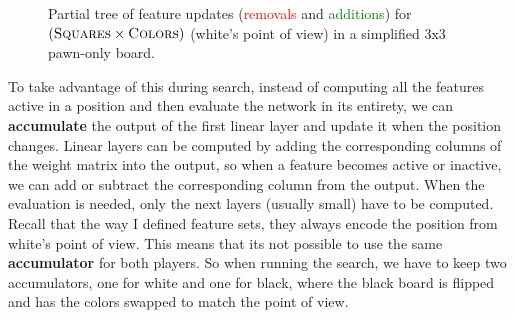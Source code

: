 \begin{figure}[H]
\caption{Partial tree of feature updates (\textcolor{Red}{removals} and \textcolor{Green}{additions}) for $(\textsc{Squares} \times \textsc{Colors})$ (white's point of view) in a simplified 3x3 pawn-only board.}
\label{fig:updates_tree}
\end{figure}

To take advantage of this during search, instead of computing all the features active in a position and then evaluate the network in its entirety, we can \textbf{accumulate} the output of the first linear layer and update it when the position changes. Linear layers can be computed by adding the corresponding columns of the weight matrix into the output, so when a feature becomes active or inactive, we can add or subtract the corresponding column from the output. When the evaluation is needed, only the next layers (usually small) have to be computed. \\

Recall that the way I defined feature sets, they always encode the position from white's point of view. This means that its not possible to use the same \textbf{accumulator} for both players. So when running the search, we have to keep two accumulators, one for white and one for black, where the black board is flipped and has the colors swapped to match the point of view.


%
%
%
%
%
%
%
%
%
%
%
%
%
%
%
%
%
%
%
%
%


